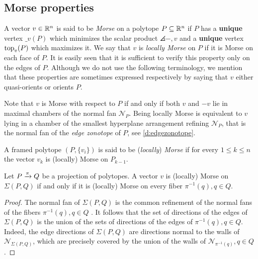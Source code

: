 
\subsection{Morse properties}


A vector $v \in \mathbb{R}^n$ is said to be \textit{Morse} on a polytope $P \subseteq \mathbb{R}^n$ if $P$ has a \textbf{unique} vertex $\bm_v(P)$ which minimizes the scalar product $\angles{-,v}$ and a \textbf{unique} vertex $\operatorname{top}_v(P)$ which maximizes it.
We say that $v$ is \textit{locally Morse} on $P$ if it is Morse on each face of $P$.
It is easily seen that it is sufficient to verify this property only on the edges of $P$.
Although we do not use the following terminology, we mention that these properties are sometimes expressed respectively by saying that $v$ either quasi-orients or orients $P$.

\begin{remark}
	Note that $v$ is Morse with respect to $P$ if and only if both $v$ and $-v$ lie in maximal chambers of the normal fan $\mathcal{N}_P$.
	Being locally Morse is equivalent to $v$ lying in a chamber of the smallest hyperplane arrangement refining $\mathcal{N}_P$, that is the normal fan of the \emph{edge zonotope} of $P$, see \cref{d:edgezonotope}. 
\end{remark}

A framed polytope $(P, \{v_i\})$ is said to be (\textit{locally}) \textit{Morse} if for every $1 \leq k \leq n$ the vector $v_k$ is (locally) Morse on $P_{k-1}$.

\begin{lemma}
\label{l:orients-the-fibers}
	Let $P \xrightarrow{\pi} Q$ be a projection of polytopes.
	A vector $v$ is (locally) Morse on $\Sigma(P, Q)$ if and only if it is (locally) Morse on every fiber $\pi^{-1}(q), q \in Q$.
\end{lemma}

\begin{proof}
	The normal fan of $\Sigma(P,Q)$ is the common refinement of the normal fans of the fibers $\pi^{-1}(q), q \in Q$ \cite[Proposition 2.2]{BilleraSturmfels94}.
	It follows that the set of directions of the edges of $\Sigma(P,Q)$ is the union of the sets of directions of the edges of $\pi^{-1}(q), q \in Q$.
	Indeed, the edge directions of $\Sigma(P,Q)$ are directions normal to the walls of $\mathcal{N}_{\Sigma(P,Q)}$, which are precisely covered by the union of the walls of $\mathcal{N}_{\pi^{-1}(q)}, q \in Q$.
\end{proof}

